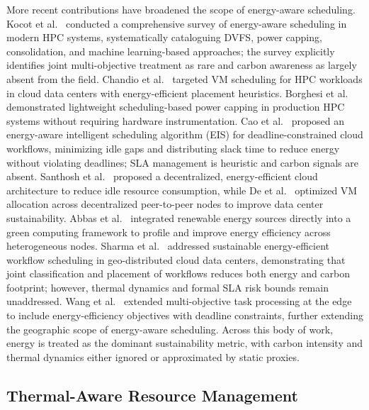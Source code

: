 \documentclass[a4paper,fleqn]{cas-dc}
\begin{document}
More recent contributions have broadened the scope of energy-aware scheduling. Kocot et al.~\cite{ref-kocot23} conducted a comprehensive survey of energy-aware scheduling in modern HPC systems, systematically cataloguing DVFS, power capping, consolidation, and machine learning-based approaches; the survey explicitly identifies joint multi-objective treatment as rare and carbon awareness as largely absent from the field. Chandio et al.~\cite{ref-chandio19} targeted VM scheduling for HPC workloads in cloud data centers with energy-efficient placement heuristics. Borghesi et al.~\cite{ref-borghesi18} demonstrated lightweight scheduling-based power capping in production HPC systems without requiring hardware instrumentation. Cao et al.~\cite{ref-cao23} proposed an energy-aware intelligent scheduling algorithm (EIS) for deadline-constrained cloud workflows, minimizing idle gaps and distributing slack time to reduce energy without violating deadlines; SLA management is heuristic and carbon signals are absent. Santhosh et al.~\cite{ref-santhosh25} proposed a decentralized, energy-efficient cloud architecture to reduce idle resource consumption, while De et al.~\cite{ref-de25} optimized VM allocation across decentralized peer-to-peer nodes to improve data center sustainability. Abbas et al.~\cite{ref-abbas23} integrated renewable energy sources directly into a green computing framework to profile and improve energy efficiency across heterogeneous nodes. Sharma et al.~\cite{ref-sharma24} addressed sustainable energy-efficient workflow scheduling in geo-distributed cloud data centers, demonstrating that joint classification and placement of workflows reduces both energy and carbon footprint; however, thermal dynamics and formal SLA risk bounds remain unaddressed. Wang et al.~\cite{ref-wangluqi25} extended multi-objective task processing at the edge to include energy-efficiency objectives with deadline constraints, further extending the geographic scope of energy-aware scheduling. Across this body of work, energy is treated as the dominant sustainability metric, with carbon intensity and thermal dynamics either ignored or approximated by static proxies.

\subsection{Thermal-Aware Resource Management}
\end{document}
